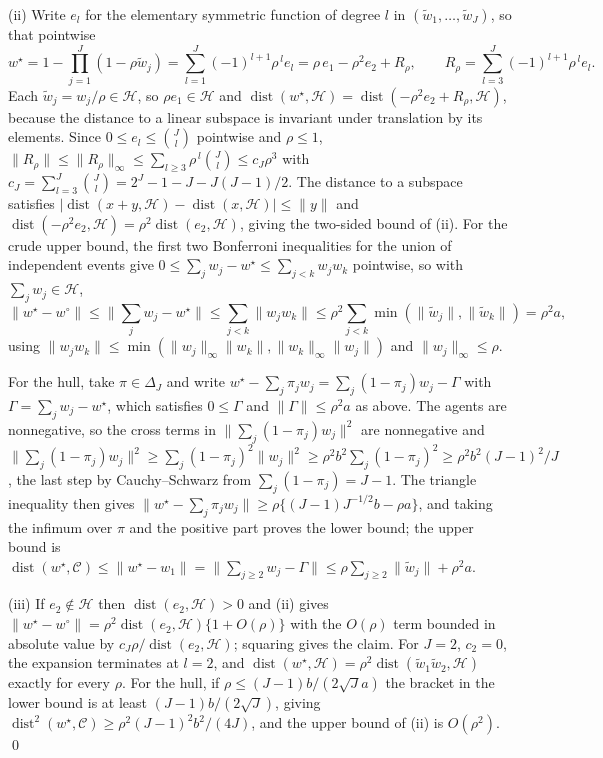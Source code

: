 \documentclass[12pt]{article}
\newcommand{\calH}{\mathcal{H}}
\newcommand{\calC}{\mathcal{C}}
\newcommand{\dist}{\operatorname{dist}}
\newcommand{\supn}[1]{\|#1\|_{\infty}}
\newcommand{\norm}[1]{\|#1\|}
\newcommand{\wstar}{w^{\star}}
\newcommand{\wproj}{w^{\circ}}
\begin{document}
(ii) Write $e_l$ for the elementary symmetric function of degree $l$ in $(\tilde w_1,\dots,\tilde w_J)$, so that pointwise
\[
\wstar=1-\prod_{j=1}^{J}(1-\rho\tilde w_j)=\sum_{l=1}^{J}(-1)^{l+1}\rho^{\,l}e_l=\rho\,e_1-\rho^2e_2+R_\rho,\qquad R_\rho=\sum_{l=3}^{J}(-1)^{l+1}\rho^{\,l}e_l .
\]
Each $\tilde w_j=w_j/\rho\in\calH$, so $\rho e_1\in\calH$ and $\dist(\wstar,\calH)=\dist(-\rho^2e_2+R_\rho,\calH)$, because the distance to a linear subspace is invariant under translation by its elements. Since $0\le e_l\le\binom Jl$ pointwise and $\rho\le1$, $\norm{R_\rho}\le\supn{R_\rho}\le\sum_{l\ge3}\rho^{\,l}\binom Jl\le c_J\rho^3$ with $c_J=\sum_{l=3}^{J}\binom Jl=2^J-1-J-J(J-1)/2$. The distance to a subspace satisfies $|\dist(x+y,\calH)-\dist(x,\calH)|\le\norm y$ and $\dist(-\rho^2e_2,\calH)=\rho^2\dist(e_2,\calH)$, giving the two-sided bound of (ii). For the crude upper bound, the first two Bonferroni inequalities for the union of independent events give $0\le\sum_jw_j-\wstar\le\sum_{j<k}w_jw_k$ pointwise, so with $\sum_jw_j\in\calH$,
\[
\norm{\wstar-\wproj}\le\Big\|\sum_jw_j-\wstar\Big\|\le\sum_{j<k}\norm{w_jw_k}\le\rho^2\sum_{j<k}\min(\norm{\tilde w_j},\norm{\tilde w_k})=\rho^2a,
\]
using $\norm{w_jw_k}\le\min(\supn{w_j}\norm{w_k},\supn{w_k}\norm{w_j})$ and $\supn{w_j}\le\rho$.

For the hull, take $\pi\in\Delta_J$ and write $\wstar-\sum_j\pi_jw_j=\sum_j(1-\pi_j)w_j-\Gamma$ with $\Gamma=\sum_jw_j-\wstar$, which satisfies $0\le\Gamma$ and $\norm\Gamma\le\rho^2a$ as above. The agents are nonnegative, so the cross terms in $\norm{\sum_j(1-\pi_j)w_j}^2$ are nonnegative and $\norm{\sum_j(1-\pi_j)w_j}^2\ge\sum_j(1-\pi_j)^2\norm{w_j}^2\ge\rho^2b^2\sum_j(1-\pi_j)^2\ge\rho^2b^2(J-1)^2/J$, the last step by Cauchy--Schwarz from $\sum_j(1-\pi_j)=J-1$. The triangle inequality then gives $\norm{\wstar-\sum_j\pi_jw_j}\ge\rho\{(J-1)J^{-1/2}b-\rho a\}$, and taking the infimum over $\pi$ and the positive part proves the lower bound; the upper bound is $\dist(\wstar,\calC)\le\norm{\wstar-w_1}=\norm{\sum_{j\ge2}w_j-\Gamma}\le\rho\sum_{j\ge2}\norm{\tilde w_j}+\rho^2a$.

(iii) If $e_2\notin\calH$ then $\dist(e_2,\calH)>0$ and (ii) gives $\norm{\wstar-\wproj}=\rho^2\dist(e_2,\calH)\{1+O(\rho)\}$ with the $O(\rho)$ term bounded in absolute value by $c_J\rho/\dist(e_2,\calH)$; squaring gives the claim. For $J=2$, $c_2=0$, the expansion terminates at $l=2$, and $\dist(\wstar,\calH)=\rho^2\dist(\tilde w_1\tilde w_2,\calH)$ exactly for every $\rho$. For the hull, if $\rho\le(J-1)b/(2\sqrt Ja)$ the bracket in the lower bound is at least $(J-1)b/(2\sqrt J)$, giving $\dist^2(\wstar,\calC)\ge\rho^2(J-1)^2b^2/(4J)$, and the upper bound of (ii) is $O(\rho^2)$. \qed
\end{document}
